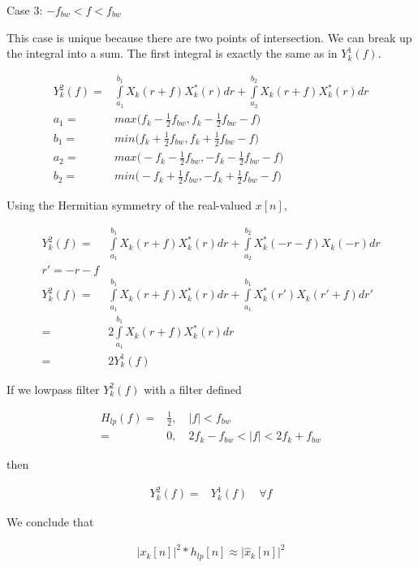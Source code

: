 \documentclass [11pt, proquest,oneside] {ganter_thesis}[2015/03/03]
\begin{document}
Case 3: $- f_{bw} < f < f_{bw}$

This case is unique because there are two points of intersection.  We can break up the integral into a sum.  The first integral is exactly the same as in $Y^1_k(f)$.

\begin{align}
Y_{k}^2(f) =& \int\limits_{a_1}^{b_1} X_{k}(r + f) X_{k}^*(r)dr + \int\limits_{a_2}^{b_2} X_{k}(r + f) X_{k}^*(r)dr \\
a_1 =& max\Big( f_k - \frac{1}{2} f_{bw},  f_k - \frac{1}{2} f_{bw} - f\Big) \\
b_1 =& min\Big( f_k + \frac{1}{2} f_{bw},  f_k + \frac{1}{2} f_{bw} - f\Big) \\
a_2 =& max\Big( -f_k - \frac{1}{2} f_{bw},  -f_k - \frac{1}{2} f_{bw} - f\Big) \\
b_2 =& min\Big( -f_k + \frac{1}{2} f_{bw},  -f_k + \frac{1}{2} f_{bw} - f\Big)
\end{align}

Using the Hermitian symmetry of the real-valued $x[n]$,

\begin{align}
Y_{k}^2(f) =& \int\limits_{a_1}^{b_1} X_{k}(r + f) X_{k}^*(r)dr + \int\limits_{a_2}^{b_2} X_{k}^*(-r - f) X_{k}(-r)dr \\
r' = -r - f \nonumber \\
Y_{k}^2(f) =& \int\limits_{a_1}^{b_1} X_{k}(r + f) X_{k}^*(r)dr + \int\limits_{a_1}^{b_1} X_{k}^*(r') X_{k}(r' + f)dr' \\
=& 2 \int\limits_{a_1}^{b_1} X_{k}(r + f) X_{k}^*(r)dr \\
=& 2 Y_k^1(f)
\end{align}

If we lowpass filter $Y_k^2(f)$ with a filter defined

\begin{align}
H_{lp}(f) =& \frac{1}{2}, \quad |f| < f_{bw} \\
=& 0, \quad 2f_k - f_{bw} < |f| < 2f_k + f_{bw}
\end{align}

then

\begin{align}
Y_{k}^2(f) =& Y_k^1(f) \quad \forall f
\end{align}

We conclude that 

\begin{align}
\label{eq:squared_cis_hilbert}
\Big| x_k[n] \Big|^2 * h_{lp}[n] \approx \Big| \widehat{x}_k[n] \Big|^2
\end{align}
\end{document}
